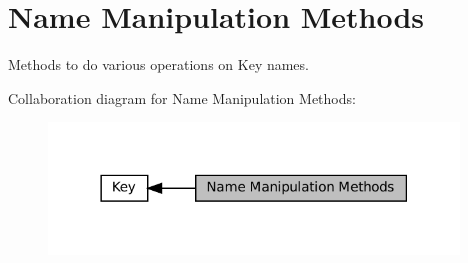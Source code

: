 \hypertarget{group__keyname}{}\section{Name Manipulation Methods}
\label{group__keyname}


Methods to do various operations on Key names.  


Collaboration diagram for Name Manipulation Methods\+:
\nopagebreak
\begin{figure}[H]
\begin{center}
\leavevmode
\includegraphics[width=309pt]{group__keyname}
\end{center}
\end{figure}
